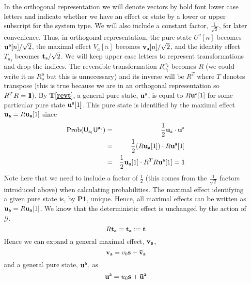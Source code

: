 \documentclass[10pt]{article}
\newcommand{\ident}{\ensuremath{1 \hspace{-1.0mm} {\bf l}}}
\begin{document}
In the orthogonal representation we will denote vectors by bold font lower case letters and indicate whether we have an effect or state by a lower or upper subscript for the system type. We will also include a constant factor, $\frac{1}{\sqrt{2}}$, for later convenience.  Thus, in orthogonal representation, the pure state $U^a[n]$ becomes ${\bf u}^\mathsf{a}[n]/\sqrt{2}$, the maximal effect $V_a[n]$ becomes ${\bf v}_\mathsf{a}[n]/\sqrt{2}$, and the identity effect $T_{a_1}$ becomes ${\bf t}_\mathsf{a}/\sqrt{2}$. We will keep upper case letters to represent transformations and drop the indices.   The reversible transformation $R_{a_1}^{a_2}$ becomes $R$ (we could write it as $R_\mathsf{a}^\mathsf{a}$ but this is unnecessary) and its inverse will be $R^T$ where $T$ denotes transpose (this is true because we are in an orthogonal representation so $R^T R = \ident$).  By {\bf T\ref{revt}}, a general pure state, ${\bf u}^\mathsf{a}$, is equal to $R{\bf u}^\mathsf{a}[1]$ for some particular pure state ${\bf u}^\mathsf{a}[1]$. This pure state is identified by the maximal effect ${\bf u}_\mathsf{a}=R{\bf u}_\mathsf{a}[1]$ since
\begin{eqnarray}
\text{Prob}(\mathsf{U_{a_1} U^{a_1}})& = & \frac{1}{2} {\bf u}_\mathsf{a}\cdot {\bf u}^\mathsf{a} \\
&=& \frac{1}{2}(R{\bf u}_\mathsf{a}[1])\cdot R{\bf u}^\mathsf{a}[1] \\
&=& \frac{1}{2}{\bf u}_\mathsf{a}[1]\cdot R^T R {\bf u}^\mathsf{a}[1] = 1
\end{eqnarray}
Note here that we need to include a factor of $\frac{1}{2}$ (this comes from the $\frac{1}{\sqrt{2}}$ factors introduced above) when calculating probabilities.
The maximal effect identifying a given pure state is, by {\bf P1}, unique.  Hence, all maximal effects can be written as ${\bf u}_\mathsf{a}=R{\bf u}_\mathsf{a}[1]$.
We know that the deterministic effect is unchanged by the action of $\mathcal{G}$.
\begin{equation}
R{\bf t}_\mathsf{a} = {\bf t}_\mathsf{a}:={\bf t}
\end{equation}
Hence we can expand a general maximal effect, ${\bf v}_\mathsf{a}$,
\begin{equation}\label{vsbarv}
{\bf v}_\mathsf{a} = v_0{\bf s} + {\bf \bar v}_\mathsf{a}
\end{equation}
and a general pure state, ${\bf u}^\mathsf{a}$, as
\begin{equation}\label{usbaru}
{\bf u}^\mathsf{a}= u_0 {\bf s} + {\bf \bar u}^\mathsf{a}
\end{equation}
\end{document}
